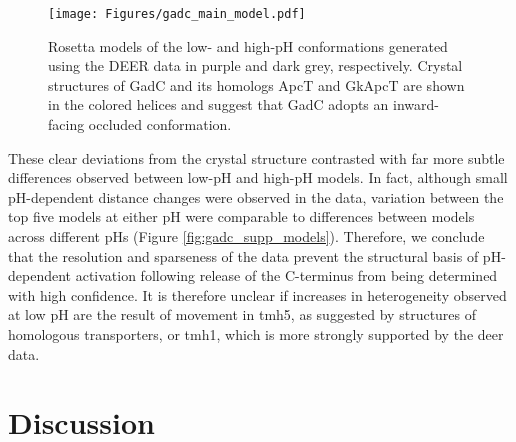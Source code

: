 \begin{figure}[h]
\centering
\texttt{[image: Figures/gadc\_main\_model.pdf]}
 \caption[Rosetta models of the low- and high-pH conformations generated using the DEER data in purple and dark grey, respectively.]{Rosetta models of the low- and high-pH conformations generated using the DEER data in purple and dark grey, respectively. Crystal structures of GadC and its homologs ApcT and GkApcT are shown in the colored helices and suggest that GadC adopts an inward-facing occluded conformation.}
\label{fig:gadc_main_model}
\end{figure}

These clear deviations from the crystal structure contrasted with far more subtle differences observed between low-pH and high-pH models. In fact, although small pH-dependent distance changes were observed in the data, variation between the top five models at either pH were comparable to differences between models across different pHs (Figure \ref{fig:gadc_supp_models}). Therefore, we conclude that the resolution and sparseness of the data prevent the structural basis of pH-dependent activation following release of the C-terminus from being determined with high confidence. It is therefore unclear if increases in heterogeneity observed at low pH are the result of movement in \gls{tmh}5, as suggested by structures of homologous transporters, or \gls{tmh}1, which is more strongly supported by the \gls{deer} data. 

\section{Discussion}\label{sec:gadc_discussion}

